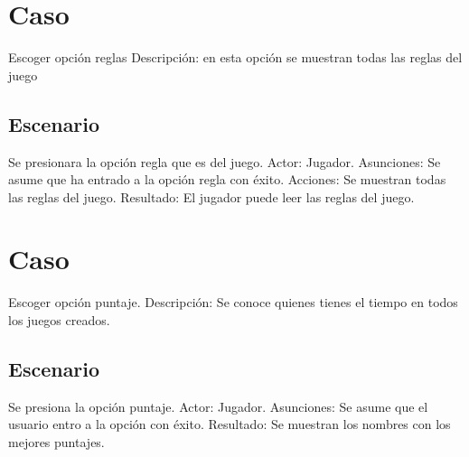\documentclass[11pt]{article} %
\begin{document}
\section{Caso} Escoger opción reglas\newline\newline
Descripción: en esta opción se muestran todas las reglas del juego

\subsection{Escenario}
Se presionara la opción regla que es del juego.\newline \newline
Actor: Jugador.\newline
Asunciones: Se asume que ha entrado a la opción regla con éxito.\newline
Acciones: Se muestran todas las reglas del juego.\newline
Resultado: El jugador puede leer las reglas del juego.\newline

\section{Caso}
Escoger opción puntaje.\newline \newline
Descripción: Se conoce quienes tienes el tiempo en todos los juegos creados.
\subsection{Escenario}
Se presiona la opción puntaje.\newline \newline
Actor: Jugador.\newline
Asunciones: Se asume que el usuario entro a la opción con éxito.\newline
Resultado: Se muestran los nombres con los mejores puntajes.\newline
\end{document}
